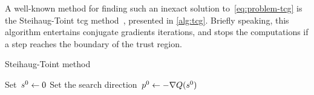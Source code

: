A well-known method for finding such an inexact solution to~\cref{eq:problem-tcg} is the Steihaug-Toint \gls{tcg} method~\cite{Steihaug_1983,Toint_1981}, presented in \cref{alg:tcg}.
Briefly speaking, this algorithm entertains conjugate gradients iterations, and stops the computations if a step reaches the boundary of the trust region.

\begin{algorithm}
    \caption{Steihaug-Toint  method}
    \label{alg:tcg}
    \DontPrintSemicolon
    \onehalfspacing
    Set~$\sstep[0] \gets 0$\;
    Set the search direction~$\pstep[0] \gets -\nabla Q(\sstep[0])$\;
\end{algorithm}

